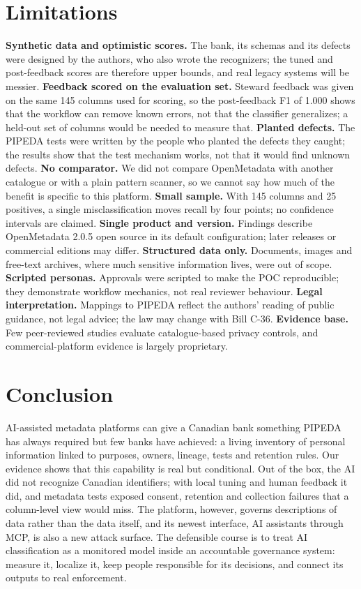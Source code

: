 \documentclass[journal,onecolumn,11pt]{IEEEtran}
\begin{document}
\section{Limitations}
\textbf{Synthetic data and optimistic scores.} The bank, its schemas and its defects were designed by the authors, who also wrote the recognizers; the tuned and post-feedback scores are therefore upper bounds, and real legacy systems will be messier. \textbf{Feedback scored on the evaluation set.} Steward feedback was given on the same 145 columns used for scoring, so the post-feedback F1 of 1.000 shows that the workflow can remove known errors, not that the classifier generalizes; a held-out set of columns would be needed to measure that. \textbf{Planted defects.} The PIPEDA tests were written by the people who planted the defects they caught; the results show that the test mechanism works, not that it would find unknown defects. \textbf{No comparator.} We did not compare OpenMetadata with another catalogue or with a plain pattern scanner, so we cannot say how much of the benefit is specific to this platform. \textbf{Small sample.} With 145 columns and 25 positives, a single misclassification moves recall by four points; no confidence intervals are claimed. \textbf{Single product and version.} Findings describe OpenMetadata 2.0.5 open source in its default configuration; later releases or commercial editions may differ. \textbf{Structured data only.} Documents, images and free-text archives, where much sensitive information lives, were out of scope. \textbf{Scripted personas.} Approvals were scripted to make the POC reproducible; they demonstrate workflow mechanics, not real reviewer behaviour. \textbf{Legal interpretation.} Mappings to PIPEDA reflect the authors' reading of public guidance, not legal advice; the law may change with Bill C-36. \textbf{Evidence base.} Few peer-reviewed studies evaluate catalogue-based privacy controls, and commercial-platform evidence is largely proprietary.

\section{Conclusion}
AI-assisted metadata platforms can give a Canadian bank something PIPEDA has always required but few banks have achieved: a living inventory of personal information linked to purposes, owners, lineage, tests and retention rules. Our evidence shows that this capability is real but conditional. Out of the box, the AI did not recognize Canadian identifiers; with local tuning and human feedback it did, and metadata tests exposed consent, retention and collection failures that a column-level view would miss. The platform, however, governs descriptions of data rather than the data itself, and its newest interface, AI assistants through MCP, is also a new attack surface. The defensible course is to treat AI classification as a monitored model inside an accountable governance system: measure it, localize it, keep people responsible for its decisions, and connect its outputs to real enforcement.
\end{document}
